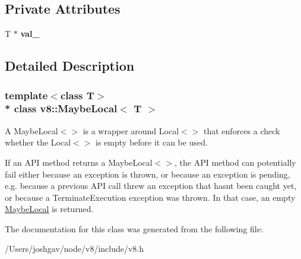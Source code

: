 \subsection*{Private Attributes}
\begin{DoxyCompactItemize}
\item 
T $\ast$ {\bfseries val\+\_\+}\hypertarget{classv8_1_1_maybe_local_aaaa3e33a607bc6d243fe00875a345cc5}{}\label{classv8_1_1_maybe_local_aaaa3e33a607bc6d243fe00875a345cc5}

\end{DoxyCompactItemize}


\subsection{Detailed Description}
\subsubsection*{template$<$class T$>$\\*
class v8\+::\+Maybe\+Local$<$ T $>$}

A Maybe\+Local$<$$>$ is a wrapper around Local$<$$>$ that enforces a check whether the Local$<$$>$ is empty before it can be used.

If an A\+PI method returns a Maybe\+Local$<$$>$, the A\+PI method can potentially fail either because an exception is thrown, or because an exception is pending, e.\+g. because a previous A\+PI call threw an exception that hasn\textquotesingle{}t been caught yet, or because a Terminate\+Execution exception was thrown. In that case, an empty \hyperlink{classv8_1_1_maybe_local}{Maybe\+Local} is returned. 

The documentation for this class was generated from the following file\+:\begin{DoxyCompactItemize}
\item 
/\+Users/joshgav/node/v8/include/v8.\+h\end{DoxyCompactItemize}
